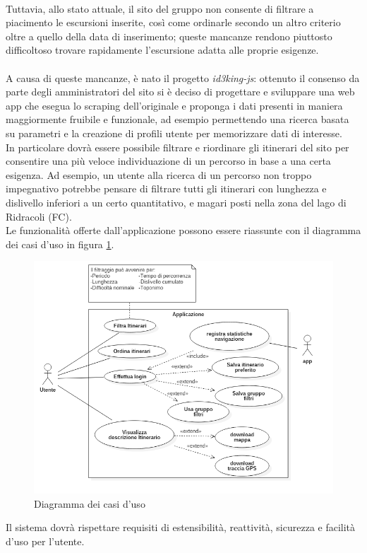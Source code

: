 \documentclass[11pt]{report}
\begin{document}
\\Tuttavia, allo stato attuale, il sito del gruppo non consente di filtrare a piacimento le escursioni inserite, così come ordinarle secondo un altro criterio oltre a quello della data di inserimento; queste mancanze rendono piuttosto difficoltoso trovare rapidamente l'escursione adatta alle proprie esigenze.
\\\\A causa di queste mancanze, è nato il progetto \textit{id3king-js}: ottenuto il consenso da parte degli amministratori del sito si è deciso di progettare e sviluppare una web app che esegua lo scraping dell'originale e proponga i dati presenti in maniera maggiormente fruibile e funzionale, ad esempio permettendo una ricerca basata su parametri e la creazione di profili utente per memorizzare dati di interesse.
\\In particolare dovrà essere possibile filtrare e riordinare gli itinerari del sito per consentire una più veloce individuazione di un percorso in base a una certa esigenza.
Ad esempio, un utente alla ricerca di un percorso non troppo impegnativo potrebbe pensare di filtrare tutti gli itinerari con lunghezza e dislivello inferiori a un certo quantitativo, e magari posti nella zona del lago di Ridracoli (FC).
\\Le funzionalità offerte dall'applicazione possono essere riassunte con il diagramma dei casi d'uso in figura \ref{use_case_diagram}.
\begin{figure}
	\centering
	\includegraphics[scale=0.5]{use_case_diagram}
	\caption{Diagramma dei casi d'uso \label{use_case_diagram}}
\end{figure}
Il sistema dovrà rispettare requisiti di estensibilità, reattività, sicurezza e facilità d'uso per l'utente.
\end{document}
